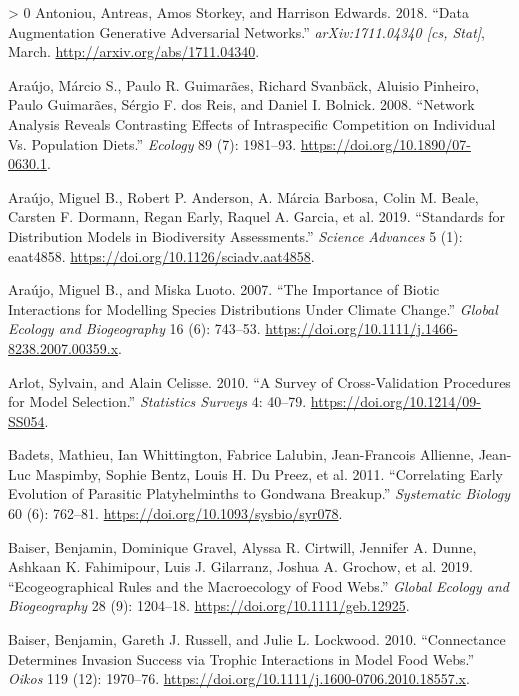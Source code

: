 \documentclass[11pt]{article}
\newlength{\cslhangindent}
\newenvironment{CSLReferences}[3] %
 {%
  \setlength{\parindent}{0pt}
  \ifodd #1 \everypar{\setlength{\hangindent}{\cslhangindent}}\ignorespaces\fi
  \ifnum #2 > 0
  \setlength{\parskip}{#2\baselineskip}
  \fi
 }%
 {}
\begin{document}
\begin{CSLReferences}{1}{0}
\leavevmode\hypertarget{ref-Antoniou2018DatAug}{}%
Antoniou, Antreas, Amos Storkey, and Harrison Edwards. 2018. {``Data
Augmentation Generative Adversarial Networks.''} \emph{arXiv:1711.04340
{[}cs, Stat{]}}, March. \url{http://arxiv.org/abs/1711.04340}.

\leavevmode\hypertarget{ref-Araujo2008NetAna}{}%
Araújo, Márcio S., Paulo R. Guimarães, Richard Svanbäck, Aluisio
Pinheiro, Paulo Guimarães, Sérgio F. dos Reis, and Daniel I. Bolnick.
2008. {``Network Analysis Reveals Contrasting Effects of Intraspecific
Competition on Individual Vs. Population Diets.''} \emph{Ecology} 89
(7): 1981--93. \url{https://doi.org/10.1890/07-0630.1}.

\leavevmode\hypertarget{ref-Araujo2019StaDis}{}%
Araújo, Miguel B., Robert P. Anderson, A. Márcia Barbosa, Colin M.
Beale, Carsten F. Dormann, Regan Early, Raquel A. Garcia, et al. 2019.
{``Standards for Distribution Models in Biodiversity Assessments.''}
\emph{Science Advances} 5 (1): eaat4858.
\url{https://doi.org/10.1126/sciadv.aat4858}.

\leavevmode\hypertarget{ref-Araujo2007ImpBio}{}%
Araújo, Miguel B., and Miska Luoto. 2007. {``The Importance of Biotic
Interactions for Modelling Species Distributions Under Climate
Change.''} \emph{Global Ecology and Biogeography} 16 (6): 743--53.
\url{https://doi.org/10.1111/j.1466-8238.2007.00359.x}.

\leavevmode\hypertarget{ref-Arlot2010SurCro}{}%
Arlot, Sylvain, and Alain Celisse. 2010. {``A Survey of Cross-Validation
Procedures for Model Selection.''} \emph{Statistics Surveys} 4: 40--79.
\url{https://doi.org/10.1214/09-SS054}.

\leavevmode\hypertarget{ref-Badets2011CorEar}{}%
Badets, Mathieu, Ian Whittington, Fabrice Lalubin, Jean-Francois
Allienne, Jean-Luc Maspimby, Sophie Bentz, Louis H. Du Preez, et al.
2011. {``Correlating Early Evolution of Parasitic Platyhelminths to
Gondwana Breakup.''} \emph{Systematic Biology} 60 (6): 762--81.
\url{https://doi.org/10.1093/sysbio/syr078}.

\leavevmode\hypertarget{ref-Baiser2019EcoRul}{}%
Baiser, Benjamin, Dominique Gravel, Alyssa R. Cirtwill, Jennifer A.
Dunne, Ashkaan K. Fahimipour, Luis J. Gilarranz, Joshua A. Grochow, et
al. 2019. {``Ecogeographical Rules and the Macroecology of Food Webs.''}
\emph{Global Ecology and Biogeography} 28 (9): 1204--18.
\url{https://doi.org/10.1111/geb.12925}.

\leavevmode\hypertarget{ref-Baiser2010ConDet}{}%
Baiser, Benjamin, Gareth J. Russell, and Julie L. Lockwood. 2010.
{``Connectance Determines Invasion Success via Trophic Interactions in
Model Food Webs.''} \emph{Oikos} 119 (12): 1970--76.
\url{https://doi.org/10.1111/j.1600-0706.2010.18557.x}.


\end{CSLReferences}
\end{document}
